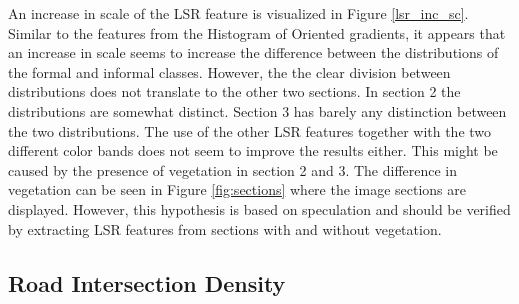 An increase in scale of the LSR feature is visualized in Figure
\ref{lsr_inc_sc}. Similar to the features from the Histogram of Oriented gradients, it appears
that an increase in scale seems to increase the difference between the
distributions of the formal and informal classes.  However, the the clear
division between distributions does not translate to the other two sections. In
section 2 the distributions are somewhat distinct. Section 3 has barely any
distinction between the two distributions. The use of the other LSR features
together with the two different color bands does not seem to improve the results either. This might be caused by the presence of vegetation in section 2 and 3. The difference in vegetation can
be seen in Figure \ref{fig:sections} where the image sections are displayed. However, this hypothesis is based on speculation and should be verified by extracting LSR features from sections with and without vegetation.

\subsection{Road Intersection Density}

